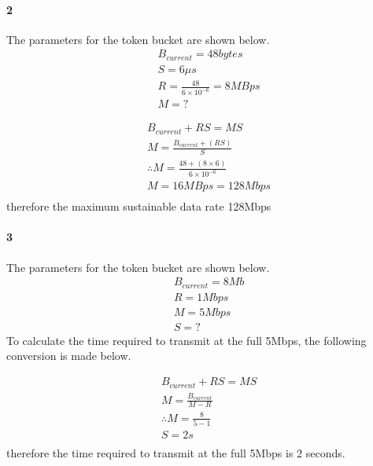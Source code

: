 \documentclass[24 pts]{article}
\begin{document}
\newpage
\paragraph{2}
The parameters for the token bucket are shown below.
\begin{equation*}
\begin{split}
&B_{current}= 48 bytes\\
&S=6\mu s\\
&R=\frac{48}{6\times 10^{-6}}=8MBps\\
&M=?
\end{split}
\end{equation*}

\begin{equation*}
\begin{split}
&B_{current} +RS=MS\\
&M=\frac{B_{current} + (RS)}{S}\\
&\therefore M=\frac{48 + (8\times 6)}{6\times 10^{-6}}\\
&M=16MBps= 128Mbps\\
\end{split}
\end{equation*}
therefore the maximum sustainable data rate 128Mbps
\newpage
\paragraph{3}

The parameters for the token bucket are shown below.
\begin{equation*}
\begin{split}
&B_{current}= 8Mb\\
&R=1Mbps\\
&M=5Mbps\\
&S=?
\end{split}
\end{equation*}
To calculate the time required to transmit at the full 5Mbps, the following conversion is made below.

\begin{equation*}
\begin{split}
&B_{current} +RS=MS\\
&M=\frac{B_{current} }{M-R}\\
&\therefore M=\frac{8}{5-1}\\
&S=2 s\\
\end{split}
\end{equation*}
therefore the time required to transmit at the full 5Mbps is 2 seconds.
\end{document}

